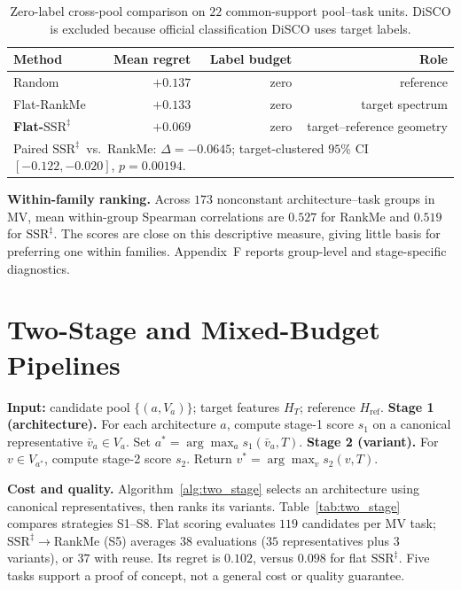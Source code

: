 \documentclass{article}
\newcommand{\SSRdag}{\ensuremath{\mathrm{SSR}^{\ddagger}}\xspace}
\begin{document}
\begin{table}[h]
\centering\small
\caption{Zero-label cross-pool comparison on $22$ common-support pool--task units. DiSCO is excluded because official classification DiSCO uses target labels.}
\label{tab:crosspool}
\begin{tabular}{lrrr}
\toprule
Method & Mean regret & Label budget & Role \\
\midrule
Random          & $+0.137$ & zero & reference \\
Flat-RankMe     & $+0.133$ & zero & target spectrum \\
\textbf{Flat-\SSRdag} & $\mathbf{+0.069}$ & zero & target--reference geometry \\
\midrule
\multicolumn{4}{l}{\small Paired \SSRdag\ vs.\ RankMe: $\Delta=-0.0645$; target-clustered $95\%$ CI $[-0.122,-0.020]$, $p=0.00194$.} \\
\bottomrule
\end{tabular}
\end{table}

\textbf{Within-family ranking.} Across $173$ nonconstant architecture--task groups in MV, mean within-group Spearman correlations are $0.527$ for RankMe and $0.519$ for \SSRdag. The scores are close on this descriptive measure, giving little basis for preferring one within families. Appendix~F reports group-level and stage-specific diagnostics.

\section{Two-Stage and Mixed-Budget Pipelines}
\label{sec:twostage}

\begin{algorithm}[h]
\caption{Two-stage source-free model transferability estimation (SF-MTE) pipeline}
\label{alg:two_stage}
\begin{algorithmic}[1]
\State \textbf{Input:} candidate pool $\{(a, V_a)\}$; target features $H_T$; reference $H_{\mathrm{ref}}$.
\State \textbf{Stage 1 (architecture).}  For each architecture $a$, compute stage-1 score $s_1$ on a canonical representative $\bar v_a \in V_a$.  Set $a^* = \arg\max_a s_1(\bar v_a, T)$.
\State \textbf{Stage 2 (variant).}  For $v \in V_{a^*}$, compute stage-2 score $s_2$.  Return $v^* = \arg\max_v s_2(v, T)$.
\end{algorithmic}
\end{algorithm}

\textbf{Cost and quality.} Algorithm~\ref{alg:two_stage} selects an architecture using canonical representatives, then ranks its variants. Table~\ref{tab:two_stage} compares strategies S1--S8. Flat scoring evaluates $119$ candidates per MV task; \SSRdag$\to$RankMe (S5) averages $38$ evaluations ($35$ representatives plus $3$ variants), or $37$ with reuse. Its regret is $0.102$, versus $0.098$ for flat \SSRdag. Five tasks support a proof of concept, not a general cost or quality guarantee.
\end{document}
